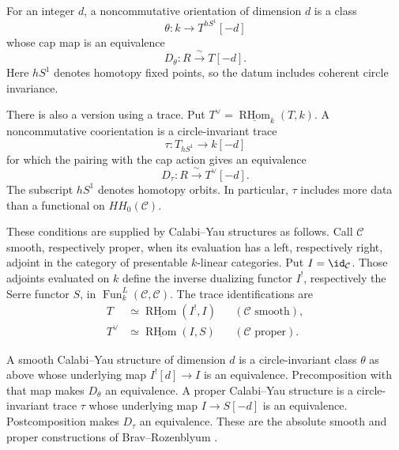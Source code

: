 For an integer $d$, a noncommutative orientation of dimension $d$ is a class
\[
 \theta:k\longrightarrow T^{hS^1}[-d]
\]
whose cap map is an equivalence
\begin{equation}\label{eq:cbc:center:cap-duality}
 D_\theta:R\xrightarrow{\ \sim\ }T[-d].
\end{equation}
Here $hS^1$ denotes homotopy fixed points, so the datum includes coherent circle invariance.

There is also a version using a trace.
Put $T^\vee=\underline{\operatorname{RHom}}_k(T,k)$.
A noncommutative coorientation is a circle-invariant trace
\[
 \tau:T_{hS^1}\longrightarrow k[-d]
\]
for which the pairing with the cap action gives an equivalence
\[
 D_\tau:R\xrightarrow{\ \sim\ }T^\vee[-d].
\]
The subscript $hS^1$ denotes homotopy orbits.
In particular, $\tau$ includes more data than a functional on $HH_0(\mathcal C)$.

These conditions are supplied by Calabi--Yau structures as follows.
Call $\mathcal C$ smooth, respectively proper, when its evaluation has a left, respectively right, adjoint in the category of presentable $k$-linear categories.
Put $I=\id_{\mathcal C}$.
Those adjoints evaluated on $k$ define the inverse dualizing functor $I^!$, respectively the Serre functor $S$, in $\operatorname{Fun}^L_k(\mathcal C,\mathcal C)$.
The trace identifications are
\[
 \begin{aligned}
 T&\simeq\underline{\operatorname{RHom}}(I^!,I)
   &&(\mathcal C\text{ smooth}),\\
 T^\vee&\simeq\underline{\operatorname{RHom}}(I,S)
   &&(\mathcal C\text{ proper}).
 \end{aligned}
\]

A smooth Calabi--Yau structure of dimension $d$ is a circle-invariant class $\theta$ as above whose underlying map $I^![d]\to I$ is an equivalence.
Precomposition with that map makes $D_\theta$ an equivalence.
A proper Calabi--Yau structure is a circle-invariant trace $\tau$ whose underlying map $I\to S[-d]$ is an equivalence.
Postcomposition makes $D_\tau$ an equivalence.
These are the absolute smooth and proper constructions of Brav--Rozenblyum
\cite[\S\S4.1.9 and 4.3.5]{BravRozenblyum}.

